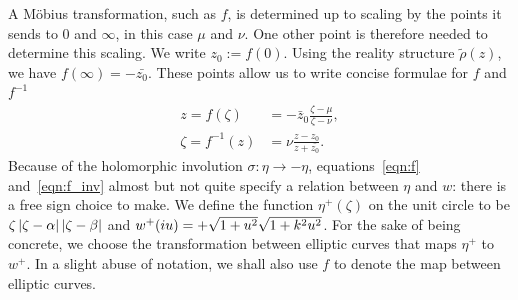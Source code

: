 \documentclass{article}
\begin{document}
A M\"obius transformation, such as $f$, is determined up to scaling by the points it sends to $0$ and $\infty$, in this case $\mu$ and $\nu$. One other point is therefore needed to determine this scaling. We write $z_0 := f(0)$. Using the reality structure $\tilde{\rho}(z)$, we have $f(\infty) = -\bar{z_0}$. These points allow us to write concise formulae for $f$ and $f^{-1}$
\begin{align}
z = f(\zeta) &= -\bar{z}_0 \frac{\zeta - \mu}{\zeta - \nu},
\label{eqn:f} \\
\zeta = f^{-1}(z) &= \nu \frac{z - z_0}{z + \bar{z_0}}.
\label{eqn:f_inv}
\end{align}
Because of the holomorphic involution $\sigma: \eta\to-\eta$, equations~\eqref{eqn:f} and~\eqref{eqn:f_inv} almost but not quite specify a relation between $\eta$ and $w$: there is a free sign choice to make. 
We define the function $\eta^+(\zeta)$ on the unit circle to be $\zeta\left|\zeta-\alpha\right|\left|\zeta-\beta\right|$ and $w^+(i u) = + \sqrt{1+u^2}\sqrt{1+k^2u^2}$.
For the sake of being concrete, we choose the transformation between elliptic curves that maps $\eta^+$ to $w^+$.
In a slight abuse of notation, we shall also use $f$ to denote the map between elliptic curves.



    
    
\end{document}
